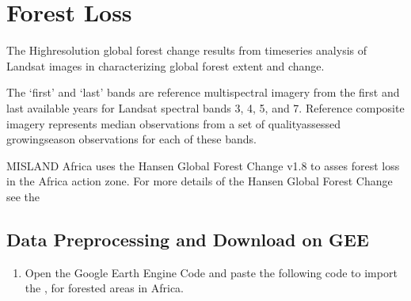 \documentclass[letterpaper,10pt,english]{sphinxmanual}
\begin{document}
\sphinxstepscope


\chapter{Forest Loss}
\label{\detokenize{Preprocessing/Forestloss:forest-loss}}\label{\detokenize{Preprocessing/Forestloss::doc}}
\sphinxAtStartPar
The High\sphinxhyphen{}resolution global forest change results from time\sphinxhyphen{}series analysis of Landsat images in characterizing global forest extent and change.

\sphinxAtStartPar
The ‘first’ and ‘last’ bands are reference multispectral imagery from the first and last available years for Landsat spectral bands 3, 4, 5, and 7. Reference composite imagery represents median observations from a set of quality\sphinxhyphen{}assessed growing\sphinxhyphen{}season observations for each of these bands.

\sphinxAtStartPar
MISLAND Africa uses the Hansen Global Forest Change v1.8 to asses forest loss in the Africa action zone. For more details of the Hansen Global Forest Change see the 


\section{Data Preprocessing and Download on GEE}
\label{\detokenize{Preprocessing/Forestloss:data-preprocessing-and-download-on-gee}}\begin{enumerate}
%
\item {} 
\sphinxAtStartPar
Open the \label{\detokenize{Preprocessing/Forestloss:google-earth-engine-code}}Google Earth Engine Code and paste the following code to import the ,  for forested areas in Africa.

\end{enumerate}
\end{document}
